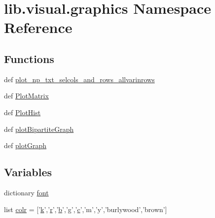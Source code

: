\hypertarget{a00121}{\section{lib.\-visual.\-graphics Namespace Reference}
\label{a00121}
}
\subsection*{Functions}
\begin{DoxyCompactItemize}
\item 
def \hyperlink{a00121_aa27c34e948992165c7a98e5ca3605549}{plot\-\_\-np\-\_\-txt\-\_\-selcols\-\_\-and\-\_\-rows\-\_\-allvarinrows}
\item 
def \hyperlink{a00121_a99e047c066345a973bfbb527e8a91085}{Plot\-Matrix}
\item 
def \hyperlink{a00121_ae680735d3b55a1e1af1fb113f492ad76}{Plot\-Hist}
\item 
def \hyperlink{a00121_a2035a4545db129f4505350f218308393}{plot\-Bipartite\-Graph}
\item 
def \hyperlink{a00121_ad28be6c8222baa4c1ee421610005c710}{plot\-Graph}
\end{DoxyCompactItemize}
\subsection*{Variables}
\begin{DoxyCompactItemize}
\item 
dictionary \hyperlink{a00121_a3c83ccb4d4d1fcb0ea5f6b8616a1d0df}{font}
\item 
list \hyperlink{a00121_aae94b6a9df961a260c0fa476e2b4693a}{colr} = \mbox{[}'\hyperlink{a00018_a1c73327b2882639bc9f5e416bb3cc7ac}{k}','\hyperlink{a00024_ac862e7284527eb913b1351c8bfb8e079}{r}','\hyperlink{a00028_a50b4f3ddde10830a3976c71083aaee3f}{b}','g','\hyperlink{a00028_a6be92348ba85ef257b11d06209e1d7b6}{c}','m','y','burlywood','brown'\mbox{]}
\end{DoxyCompactItemize}


